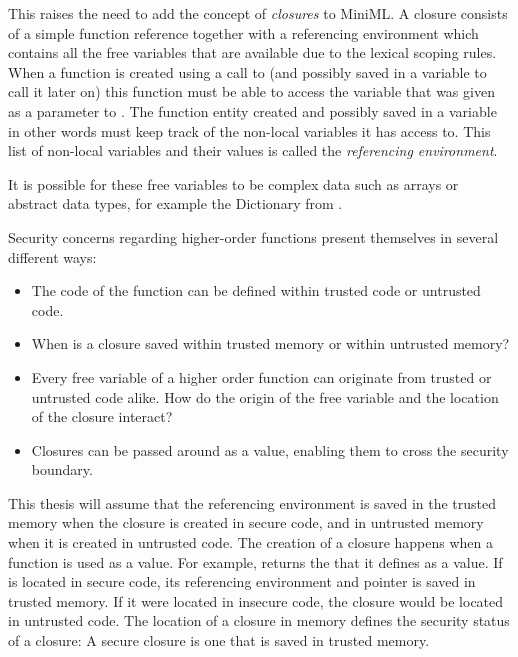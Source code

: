 %


This raises the need to add the concept of \emph{closures} to \mbox{MiniML}.
A closure consists of a simple function reference together with a referencing environment which contains all the free variables that are available due to the lexical scoping rules.
When a function is created using a call to  (and possibly saved in a variable to call it later on) this function must be able to access the variable  that was given as a parameter to .
The function entity created and possibly saved in a variable in other words must keep track of the non-local variables it has access to.
This list of non-local variables and their values is called the \emph{referencing environment}.

It is possible for these free variables to be complex data such as arrays or abstract data types, for example the Dictionary from . 

Security concerns regarding higher-order functions present themselves in several different ways:

\begin{itemize}
\item The code of the function can be defined within trusted code or untrusted code.
\item When is a closure saved within trusted memory or within untrusted memory?
\item Every free variable of a higher order function can originate from trusted or untrusted code alike.
How do the origin of the free variable and the location of the closure interact?
\item Closures can be passed around as a value, enabling them to cross the security boundary.
\end{itemize}

This thesis will assume that the referencing environment is saved in the trusted memory when the closure is created in secure code, and in untrusted memory when it is created in untrusted code.
The creation of a closure happens when a function is used as a value.
For example,  returns the  that it defines as a value.
If  is located in secure code, its referencing environment and pointer is saved in trusted memory.
If it were located in insecure code, the closure would be located in untrusted code.
The location of a closure in memory defines the security status of a closure: A secure closure is one that is saved in trusted memory.

